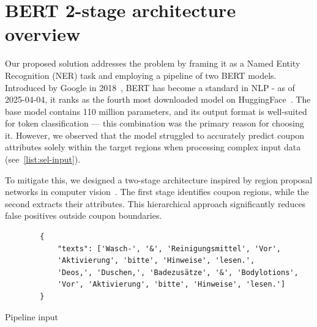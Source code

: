 \documentclass[licencjacka,en]{pracamgr}
\begin{document}
\chapter{BERT 2-stage architecture overview}
Our proposed solution addresses the problem by framing it as a Named Entity Recognition (NER) task and employing a pipeline of two BERT models. Introduced by Google in 2018~\cite{BERT_intro}, BERT has become a standard in NLP - as of 2025-04-04, it ranks as the fourth most downloaded model on HuggingFace~\cite{BERT_hf}. The base model contains 110 million parameters, and its output format is well-suited for token classification — this combination was the primary reason for choosing it. However, we observed that the model struggled to accurately predict coupon attributes solely within the target regions when processing complex input data (see~\ref{list:sel-input}).

To mitigate this, we designed a two-stage architecture inspired by region proposal networks in computer vision~\cite{Region_proposal}. The first stage identifies coupon regions, while the second extracts their attributes. This hierarchical approach significantly reduces false positives outside coupon boundaries.
\begin{center}
   \begin{listing}
        \begin{verbatim}
        {
            "texts": ['Wasch-', '&', 'Reinigungsmittel', 'Vor',
            'Aktivierung', 'bitte', 'Hinweise', 'lesen.',
            'Deos,', 'Duschen,', 'Badezusätze', '&', 'Bodylotions',
            'Vor', 'Aktivierung', 'bitte', 'Hinweise', 'lesen.']
        }
        \end{verbatim}
        \caption{Pipeline input}
        \label{list:sel-input}
    \end{listing}
\end{center}
\end{document}
